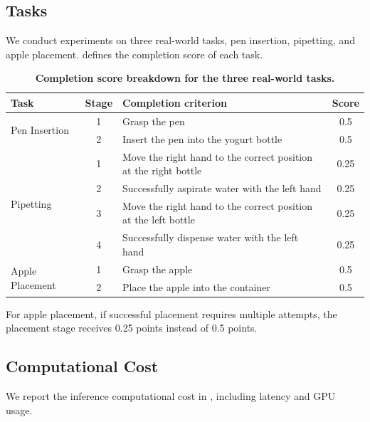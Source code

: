\documentclass[10pt,twocolumn,letterpaper]{article}
\begin{document}
\subsection{Tasks}
We conduct experiments on three real-world tasks, pen insertion, pipetting, and apple placement.  defines the completion score of each task.
\begin{table}[t]
\centering

\setlength{\tabcolsep}{3pt}
\caption{\textbf{Completion score breakdown for the three real-world tasks.}}
\label{tab:stage-scores}
\begin{tabular}{lcp{}c}
\toprule
Task & Stage & Completion criterion & Score \\
\midrule
\multirow{2}{*}{Pen Insertion}
 & 1 & Grasp the pen & 0.5 \\
 & 2 & Insert the pen into the yogurt bottle & 0.5 \\
\midrule
\multirow{4}{*}{Pipetting}
 & 1 & Move the right hand to the correct position at the right bottle & 0.25 \\
 & 2 & Successfully aspirate water with the left hand & 0.25 \\
 & 3 & Move the right hand to the correct position at the left bottle & 0.25 \\
 & 4 & Successfully dispense water with the left hand & 0.25 \\
\midrule
\multirow{2}{*}{Apple Placement}
 & 1 & Grasp the apple & 0.5 \\
 & 2 & Place the apple into the container & 0.5 \\
\bottomrule
\end{tabular}
\par\smallskip
\begin{minipage}{0.98\textwidth}
\footnotesize
For apple placement, if successful placement requires multiple attempts, the placement stage receives 0.25 points instead of 0.5 points.
\end{minipage}



\end{table}

\subsection{Computational Cost}
We report the inference computational cost in , including latency and GPU usage.
\end{document}
